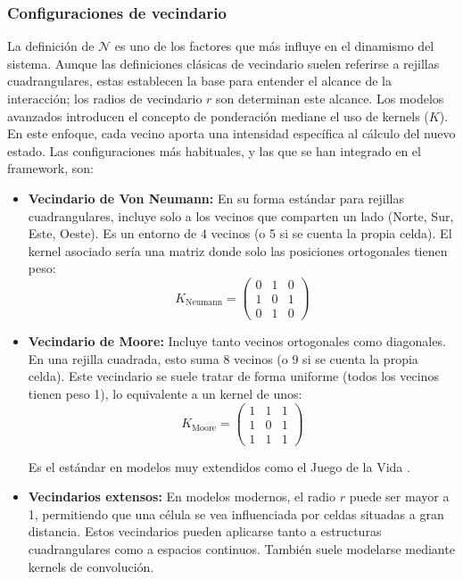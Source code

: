 \documentclass[runningheads]{llncs}
\begin{document}
\subsubsection{Configuraciones de vecindario}
La definición de $\mathcal{N}$ es uno de los factores que más influye en el dinamismo del sistema. Aunque las definiciones clásicas de vecindario suelen referirse a rejillas cuadrangulares, estas establecen la base para entender el alcance de la interacción; los radios de vecindario $r$ son determinan este alcance. Los modelos avanzados introducen el concepto de ponderación mediane el uso de kernels ($K$). En este enfoque, cada vecino aporta una intensidad específica al cálculo del nuevo estado. Las configuraciones más habituales, y las que se han integrado en el framework, son:
\begin{itemize}
    \item \textbf{Vecindario de Von Neumann:} En su forma estándar para rejillas cuadrangulares, incluye solo a los vecinos que comparten un lado (Norte, Sur, Este, Oeste). Es un entorno de 4 vecinos (o 5 si se cuenta la propia celda).  El kernel asociado sería una matriz donde solo las posiciones ortogonales tienen peso:
    \begin{equation}
    K_{\text{Neumann}} = \begin{pmatrix} 0 & 1 & 0 \\ 1 & 0 & 1 \\ 0 & 1 & 0 \end{pmatrix}
    \end{equation}
    \item \textbf{Vecindario de Moore:} Incluye tanto vecinos ortogonales como diagonales. En una rejilla cuadrada, esto suma 8 vecinos (o 9 si se cuenta la propia celda). Este vecindario se suele tratar de forma uniforme (todos los vecinos tienen peso 1), lo equivalente a un kernel de unos:
    \begin{equation}
    K_{\text{Moore}} = \begin{pmatrix} 1 & 1 & 1 \\ 1 & 0 & 1 \\ 1 & 1 & 1 \end{pmatrix}
    \end{equation}

    Es el estándar en modelos muy extendidos como el Juego de la Vida \cite{ref_gol}.
    \item \textbf{Vecindarios extensos:} En modelos modernos, el radio $r$ puede ser mayor a 1, permitiendo que una célula se vea influenciada por celdas situadas a gran distancia. Estos vecindarios pueden aplicarse tanto a estructuras cuadrangulares como a espacios continuos.
     También suele modelarse mediante kernels de convolución.
\end{itemize}
\end{document}
